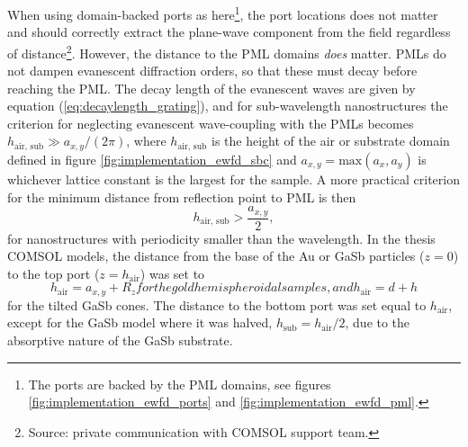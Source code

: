 When using domain-backed ports as here\footnote{The ports are backed by the PML domains, see figures \ref{fig:implementation_ewfd_ports} and \ref{fig:implementation_ewfd_pml}.}, the port locations does not matter and should correctly extract the plane-wave component from the field regardless of distance\footnote{Source: private communication with COMSOL support team.}. However, the distance to the PML domains \emph{does} matter. PMLs do not dampen evanescent diffraction orders, so that these must decay before reaching the PML\cite{PML_reflectionOfEvanescentWaves1}\cite{PML_reflectionOfEvanescentWaves2}. The decay length of the evanescent waves are given by equation (\ref{eq:decaylength_grating}), and for sub-wavelength nanostructures the criterion for neglecting evanescent wave-coupling with the PMLs becomes $h_{\text{air, sub}}\gg a_{x,y}/(2\pi)$, where $h_{\text{air, sub}}$ is the height of the air or substrate domain defined in figure \ref{fig:implementation_ewfd_sbc} and  $a_{x,y}=\text{max}(a_x,a_y)$ is whichever lattice constant is the largest for the sample\cite{decaylength_comsolsupport}. A more practical criterion for the minimum distance from reflection point to PML is then 
\begin{equation}
    h_{\text{air, sub}}> \frac{a_{x,y}}{2},
    \label{eq:height_physicaldomain}
\end{equation}
for nanostructures with periodicity smaller than the wavelength\cite{decaylength_comsolsupport}. In the thesis COMSOL models, the distance from the base of the Au or GaSb particles ($z=0$) to the top port ($z=h_{\text{air}}$) was set to
\begin{subequations}
\begin{equation}
    h_{\text{air}} = a_{x,y} + R_z
    \label{eq:h_air_goldparticles}
\end{equation}
for the gold hemispheroidal samples, and
\begin{equation}
    h_{\text{air}} = d + h
\end{equation}
\end{subequations}
for the tilted GaSb cones. The distance to the bottom port was set equal to $ h_{\text{air}}$, except for the GaSb model where it was halved, $h_{\text{sub}} = h_{\text{air}}/2$, due to the absorptive nature of the GaSb substrate. %

